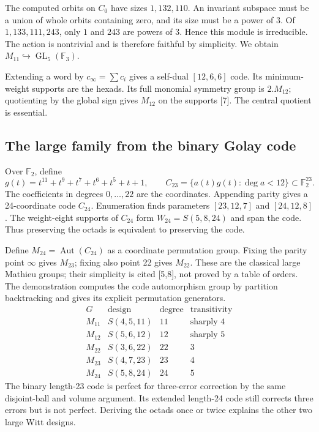 \documentclass[12pt,letterpaper]{article}
\theoremstyle{definition}
\theoremstyle{remark}
\newcommand{\F}{\mathbb F}\newcommand{\Z}{\mathbb Z}
\DeclareMathOperator{\GL}{GL}\DeclareMathOperator{\SL}{SL}
\DeclareMathOperator{\Aut}{Aut}\DeclareMathOperator{\Hom}{Hom}
\begin{document}
The computed orbits on $C_0$ have sizes $1,132,110$. An invariant subspace must be a union of whole orbits containing zero, and its size must be a power of 3. Of $1,133,111,243$, only $1$ and $243$ are powers of 3. Hence this module is irreducible. The action is nontrivial and is therefore faithful by simplicity. We obtain $M_{11}\hookrightarrow\GL_5(\F_3)$.

Extending a word by $c_\infty=\sum c_i$ gives a self-dual $[12,6,6]$ code. Its minimum-weight supports are the hexads. Its full monomial symmetry group is $2.M_{12}$; quotienting by the global sign gives $M_{12}$ on the supports [7]. The central quotient is essential.

\subsection*{The large family from the binary Golay code}
Over $\F_2$, define
\[
 g(t)=t^{11}+t^9+t^7+t^6+t^5+t+1,\qquad
 C_{23}=\{a(t)g(t):\deg a<12\}\subset\F_2^{23}.
\]
The coefficients in degrees $0,\ldots,22$ are the coordinates. Appending parity gives a 24-coordinate code $C_{24}$. Enumeration finds parameters $[23,12,7]$ and $[24,12,8]$. The weight-eight supports of $C_{24}$ form $W_{24}=S(5,8,24)$ and span the code. Thus preserving the octads is equivalent to preserving the code.

Define $M_{24}=\Aut(C_{24})$ as a coordinate permutation group. Fixing the parity point $\infty$ gives $M_{23}$; fixing also point 22 gives $M_{22}$. These are the classical large Mathieu groups; their simplicity is cited [5,8], not proved by a table of orders. The demonstration computes the code automorphism group by partition backtracking and gives its explicit permutation generators.
\[
\begin{array}{c|c|c|c}
G&\text{design}&\text{degree}&\text{transitivity}\\\hline
M_{11}&S(4,5,11)&11&\text{sharply }4\\
M_{12}&S(5,6,12)&12&\text{sharply }5\\
M_{22}&S(3,6,22)&22&3\\
M_{23}&S(4,7,23)&23&4\\
M_{24}&S(5,8,24)&24&5
\end{array}
\]
The binary length-23 code is perfect for three-error correction by the same disjoint-ball and volume argument. Its extended length-24 code still corrects three errors but is not perfect. Deriving the octads once or twice explains the other two large Witt designs.
\end{document}
